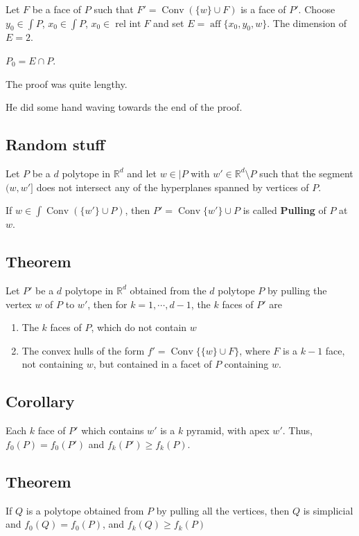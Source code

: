 \documentclass[11pt]{article}
\def\R{\mathbb{R}}
\def\aff{\operatorname{aff}}
\def\relint{\operatorname{rel\ int}}
\def\conv{\operatorname{Conv}}
\begin{document}
{{{{Let \(F\) be a face of \(P\) such that \(F' = \conv (\{w \} \cup F)\) is a face of
\(P'\). Choose \(y_0 \in \int P\), \(x_0 \in \int P\), \(x_0 \in \relint F\) and set
\(E = \aff \{x_0, y_0, w\}\). The dimension of \(E = 2\).

\(P_0 = E \cap P\).

The proof was quite lengthy.

He did some hand waving towards the end of the proof.
\subsection{Random stuff}
\label{sec:orgab73a23}
Let \(P\) be a \(d\) polytope in \(\R^d\) and let \(w \in \vert P\) with \(w' \in \R^d
   \setminus P\) such that the segment \((w, w']\) does not intersect any of the
hyperplanes spanned by vertices of \(P\).

If \(w \in \int \conv (\{w'\} \cup P)\), then \(P'= \conv \{w'\} \cup P\) is
called \textbf{Pulling} of \(P\) at \(w\).
\subsection{Theorem}
\label{sec:org27a0b9d}
Let \(P'\) be a \(d\) polytope in \(\R^d\) obtained from the \(d\) polytope \(P\) by
pulling the vertex \(w\) of \(P\) to \(w'\), then for \(k = 1, \cdots, d -1\), the
\(k\) faces of \(P'\) are 

\begin{enumerate}
\item The \(k\) faces of \(P\), which do not contain \(w\)
\item The convex hulls of the form \(f' = \conv\{\{w\} \cup F\}\), where \(F\) is a
\(k-1\) face, not containing \(w\), but contained in a facet of \(P\) containing
\(w\).
\end{enumerate}
\subsection{Corollary}
\label{sec:orgf0b17b0}
Each \(k\) face of \(P'\) which contains \(w'\) is a \(k\) pyramid, with apex \(w'\).
Thus, \(f_0(P) = f_0(P')\) and \(f_k(P') \ge f_k(P)\).
\subsection{Theorem}
\label{sec:org628ba7d}
If \(Q\) is a polytope obtained from \(P\) by pulling all the vertices, then \(Q\)
is simplicial and \(f_0(Q) = f_0(P)\), and \(f_k(Q) \ge f_k(P)\)

}}}}
\end{document}
